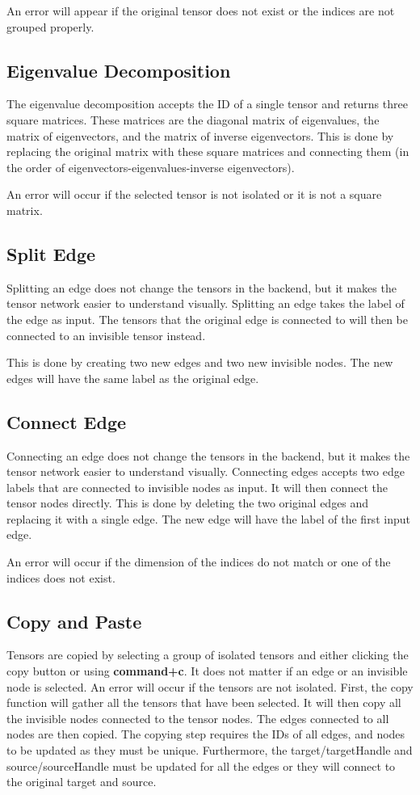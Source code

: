 \documentclass{juliacon}
\begin{document}
\begin{appendix}
An error will appear if the original tensor does not exist or the indices are not grouped properly.


\subsection{Eigenvalue Decomposition}
The eigenvalue decomposition accepts the ID of a single tensor and returns three square matrices. These matrices are the diagonal matrix of eigenvalues, the matrix of eigenvectors, and the matrix of inverse eigenvectors. This is done by replacing the original matrix with these square matrices and connecting them (in the order of eigenvectors-eigenvalues-inverse eigenvectors). 

An error will occur if the selected tensor is not isolated or it is not a square matrix.

\subsection{Split Edge}
Splitting an edge does not change the tensors in the backend, but it makes the tensor network easier to understand visually. Splitting an edge takes the label of the edge as input. The tensors that the original edge is connected to will then be connected to an invisible tensor instead.

This is done by creating two new edges and two new invisible nodes. The new edges will have the same label as the original edge.

\subsection{Connect Edge}
Connecting an edge does not change the tensors in the backend, but it makes the tensor network easier to understand visually. Connecting edges accepts two edge labels that are connected to invisible nodes as input. It will then connect the tensor nodes directly. This is done by deleting the two original edges and replacing it with a single edge. The new edge will have the label of the first input edge. 

An error will occur if the dimension of the indices do not match or one of the indices does not exist.

\subsection{Copy and Paste}
Tensors are copied by selecting a group of isolated tensors and either clicking the copy button or using \textbf{command+c}. It does not matter if an edge or an invisible node is selected. An error will occur if the tensors are not isolated. First, the copy function will gather all the tensors that have been selected. It will then copy all the invisible nodes connected to the tensor nodes. The edges connected to all nodes are then copied. The copying step requires the IDs of all edges, and nodes to be updated as they must be unique. Furthermore, the target/targetHandle and source/sourceHandle must be updated for all the edges or they will connect to the original target and source.


\end{appendix}
\end{document}

